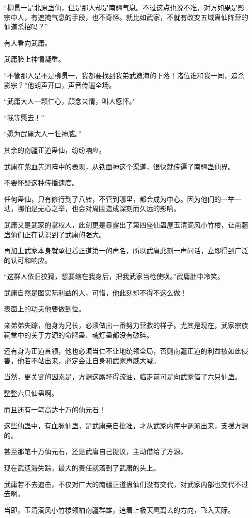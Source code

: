 \begin{this_body}
“柳贯一是北原蛊仙，但是那人却是南疆气息。不过这点也说不准，对方如果是影宗中人，有遮掩气息的手段，也不奇怪。就比如武家，不就有改变五域蛊仙阵营的仙道杀招吗？”

有人看向武庸。

武庸脸上神情凝重。

“不管那人是不是柳贯一，我都要找到我弟武遗海的下落！诸位谁和我一同，追杀影宗？”他朗声开口，声音传遍全场。

“武庸大人一颗仁心，顾念亲情，叫人感怀。”

“我等愿去！”

“愿为武庸大人一壮神威。”

其余的南疆正道蛊仙，纷纷响应。

武庸在紫血先河阵中的表现，从铁面神这个渠道，很快就传遍了南疆蛊仙界。

不要怀疑这种传播速度。

任何蛊仙，只有修行到了八转，不管到哪里，都会成为中心。因为他们的一举一动，哪怕是无心之举，也会对周围造成深刻而久远的影响。

武庸又是武家的掌权人，此刻更是暴露出了第四座仙蛊屋玉清滴风小竹楼，让南疆蛊仙们正在认识到了武庸的强大。

再加上武家本身就承担着正道第一的声名，所以武庸此刻一声问话，立即得到广泛的认可和响应。

“这群人依旧狡猾，想要缩在我身后，把我武家当枪使唤。”武庸肚中冷笑。

武庸自然是图实际利益的人，可惜，他此刻却不得不这么做！

表面上的功夫他要做到位。

亲弟弟失踪，他身为兄长，必须做出一番努力营救的样子。尤其是现在，武家宗族祠堂中的关于方源的命牌蛊、魂灯蛊都没有破碎。

还有身为正道首领，他也必须当仁不让地统领全局，否则南疆正道的利益被如此侵害，他若不站出来，必定会让自身和武家声威大减。

当然，更关键的因素是，方源这厮坏得流油，临走前可是向武家借了六只仙蛊。

整整六只仙蛊啊。

而且还有一笔高达十万的仙元石！

这些仙蛊中，有血脉仙蛊，是武庸亲自批准，才从武家内库中调派出来，支援方源的。

甚至那笔十万仙元石，还是武庸自己提议，主动借给了方源。

现在武遗海失踪，最大的责任就落到了武庸的头上。

武庸若不去追击，不仅对广大的南疆正道蛊仙们没有交代，对武家内部也交代不过去啊。

当即，玉清滴风小竹楼领袖南疆群雄，追着上极天鹰离去的方向，飞入天际。


\end{this_body}
